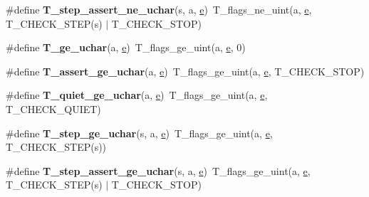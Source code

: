 \begin{DoxyCompactItemize}
\#define {\bfseries T\+\_\+step\+\_\+assert\+\_\+ne\+\_\+uchar}(s,  a,  \mbox{\hyperlink{sun4u_2tte_8h_a8b0b9ed08e0e18920ec2682f48228c27}{e}})~T\+\_\+flags\+\_\+ne\+\_\+uint(a, \mbox{\hyperlink{sun4u_2tte_8h_a8b0b9ed08e0e18920ec2682f48228c27}{e}}, T\+\_\+\+C\+H\+E\+C\+K\+\_\+\+S\+T\+EP(s) $\vert$ T\+\_\+\+C\+H\+E\+C\+K\+\_\+\+S\+T\+OP)
\item 
\mbox{\label{group__RTEMSTestFrameworkChecksUChar_gafdae874cc6df9fde88db7f793c167849}} 
\#define {\bfseries T\+\_\+ge\+\_\+uchar}(a,  \mbox{\hyperlink{sun4u_2tte_8h_a8b0b9ed08e0e18920ec2682f48228c27}{e}})~T\+\_\+flags\+\_\+ge\+\_\+uint(a, \mbox{\hyperlink{sun4u_2tte_8h_a8b0b9ed08e0e18920ec2682f48228c27}{e}}, 0)
\item 
\mbox{\label{group__RTEMSTestFrameworkChecksUChar_gacf075aa1779c490c06774df22dd6512c}} 
\#define {\bfseries T\+\_\+assert\+\_\+ge\+\_\+uchar}(a,  \mbox{\hyperlink{sun4u_2tte_8h_a8b0b9ed08e0e18920ec2682f48228c27}{e}})~T\+\_\+flags\+\_\+ge\+\_\+uint(a, \mbox{\hyperlink{sun4u_2tte_8h_a8b0b9ed08e0e18920ec2682f48228c27}{e}}, T\+\_\+\+C\+H\+E\+C\+K\+\_\+\+S\+T\+OP)
\item 
\mbox{\label{group__RTEMSTestFrameworkChecksUChar_ga4890c019ba1e7e61ce97d1e9bf6ed3e5}} 
\#define {\bfseries T\+\_\+quiet\+\_\+ge\+\_\+uchar}(a,  \mbox{\hyperlink{sun4u_2tte_8h_a8b0b9ed08e0e18920ec2682f48228c27}{e}})~T\+\_\+flags\+\_\+ge\+\_\+uint(a, \mbox{\hyperlink{sun4u_2tte_8h_a8b0b9ed08e0e18920ec2682f48228c27}{e}}, T\+\_\+\+C\+H\+E\+C\+K\+\_\+\+Q\+U\+I\+ET)
\item 
\mbox{\label{group__RTEMSTestFrameworkChecksUChar_ga89f14aedc7a57a6ddc746399a7d0f213}} 
\#define {\bfseries T\+\_\+step\+\_\+ge\+\_\+uchar}(s,  a,  \mbox{\hyperlink{sun4u_2tte_8h_a8b0b9ed08e0e18920ec2682f48228c27}{e}})~T\+\_\+flags\+\_\+ge\+\_\+uint(a, \mbox{\hyperlink{sun4u_2tte_8h_a8b0b9ed08e0e18920ec2682f48228c27}{e}}, T\+\_\+\+C\+H\+E\+C\+K\+\_\+\+S\+T\+EP(s))
\item 
\mbox{\label{group__RTEMSTestFrameworkChecksUChar_ga4bdfb67851249ac04f7385ac73410440}} 
\#define {\bfseries T\+\_\+step\+\_\+assert\+\_\+ge\+\_\+uchar}(s,  a,  \mbox{\hyperlink{sun4u_2tte_8h_a8b0b9ed08e0e18920ec2682f48228c27}{e}})~T\+\_\+flags\+\_\+ge\+\_\+uint(a, \mbox{\hyperlink{sun4u_2tte_8h_a8b0b9ed08e0e18920ec2682f48228c27}{e}}, T\+\_\+\+C\+H\+E\+C\+K\+\_\+\+S\+T\+EP(s) $\vert$ T\+\_\+\+C\+H\+E\+C\+K\+\_\+\+S\+T\+OP)

\end{DoxyCompactItemize}
